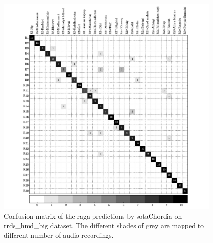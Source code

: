 \begin{figure}
	\begin{center}
		\includegraphics[width=\figSizeHundred]{ch07_ragaRecognition/figures/CM_pcd_hmd.pdf}
	\end{center}
	\caption[Confusion matrix of the classification results by \acrshort{sotaChordia} on \acrshort{rrds_hmd_big}]{Confusion matrix of the \gls{raga} predictions by \acrshort{sotaChordia} on \acrshort{rrds_hmd_big} dataset. The different shades of grey are mapped to different number of audio recordings.}
	\label{fig:confusion_matrix_hmd_chordia}
\end{figure}



